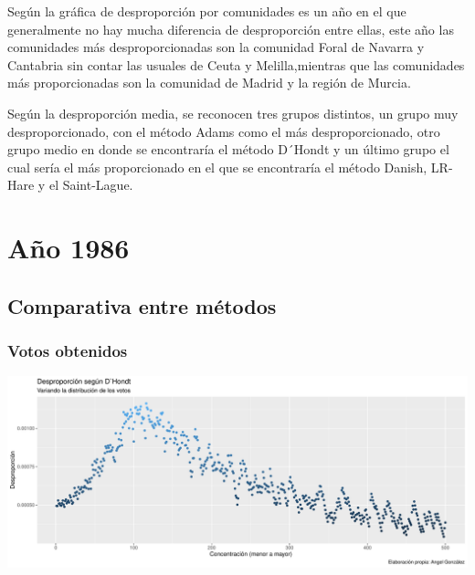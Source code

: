 \documentclass[12pt,a4paper,]{book}
\numberwithin{dummy}{section}
\theoremstyle{ocrenumbox}
\theoremstyle{blacknumex}
\theoremstyle{blacknumbox}
\theoremstyle{ocrenum}
\theoremstyle{ocrenum}
\begin{document}
Según la gráfica de desproporción por comunidades es un año en el que
generalmente no hay mucha diferencia de desproporción entre ellas, este
año las comunidades más desproporcionadas son la comunidad Foral de
Navarra y Cantabria sin contar las usuales de Ceuta y Melilla,mientras
que las comunidades más proporcionadas son la comunidad de Madrid y la
región de Murcia.

Según la desproporción media, se reconocen tres grupos distintos, un
grupo muy desproporcionado, con el método Adams como el más
desproporcionado, otro grupo medio en donde se encontraría el método
D´Hondt y un último grupo el cual sería el más proporcionado en el que
se encontraría el método Danish, LR-Hare y el Saint-Lague.

\hypertarget{auxf1o-1986}{%
\section{Año 1986}\label{auxf1o-1986}}

\hypertarget{comparativa-entre-muxe9todos-3}{%
\subsection{Comparativa entre
métodos}\label{comparativa-entre-muxe9todos-3}}

\hypertarget{votos-obtenidos-3}{%
\subsubsection{Votos obtenidos}\label{votos-obtenidos-3}}

\begin{center}\includegraphics[width=1\linewidth]{figurasR/unnamed-chunk-14-1} \end{center}
\end{document}
